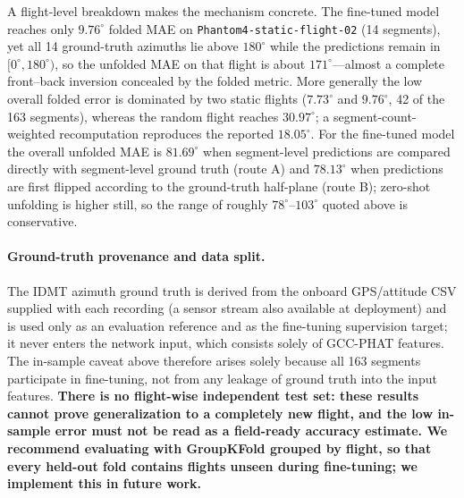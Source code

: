 \documentclass[sensors,article,submit,pdftex,moreauthors]{Definitions/mdpi}
\begin{document}
A flight-level breakdown makes the mechanism concrete. The fine-tuned model reaches only $9.76^\circ$ folded MAE on \texttt{Phantom4-static-flight-02} (14 segments), yet all 14 ground-truth azimuths lie above $180^\circ$ while the predictions remain in $[0^\circ,180^\circ)$, so the unfolded MAE on that flight is about $171^\circ$---almost a complete front--back inversion concealed by the folded metric. More generally the low overall folded error is dominated by two static flights ($7.73^\circ$ and $9.76^\circ$, 42 of the 163 segments), whereas the random flight reaches $30.97^\circ$; a segment-count-weighted recomputation reproduces the reported $18.05^\circ$. For the fine-tuned model the overall unfolded MAE is $81.69^\circ$ when segment-level predictions are compared directly with segment-level ground truth (route A) and $78.13^\circ$ when predictions are first flipped according to the ground-truth half-plane (route B); zero-shot unfolding is higher still, so the range of roughly $78^\circ$--$103^\circ$ quoted above is conservative.
\paragraph{Ground-truth provenance and data split.}
The IDMT azimuth ground truth is derived from the onboard GPS/attitude CSV supplied with each recording (a sensor stream also available at deployment) and is used only as an evaluation reference and as the fine-tuning supervision target; it never enters the network input, which consists solely of GCC-PHAT features. The in-sample caveat above therefore arises solely because all 163 segments participate in fine-tuning, not from any leakage of ground truth into the input features. \textbf{There is no flight-wise independent test set: these results cannot prove generalization to a completely new flight, and the low in-sample error must not be read as a field-ready accuracy estimate. We recommend evaluating with GroupKFold grouped by flight, so that every held-out fold contains flights unseen during fine-tuning; we implement this in future work.}
\end{document}
